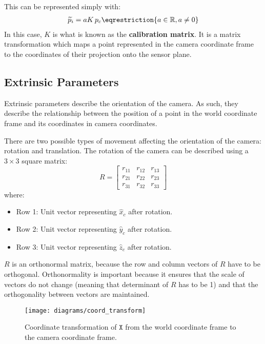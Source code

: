 This can be represented simply with:
\begin{gather}
    \widetilde{p}_i = aK\, p_c \label{eq:pi} \eqrestriction{a \in \Real, a \neq 0}
\end{gather}
In this case, $K$ is what is known as the \textbf{calibration matrix}. It is a matrix transformation which maps a point represented in the camera coordinate frame to the coordinates of their projection onto the sensor plane.

\subsection{Extrinsic Parameters} \label{sec:extrinsics}

Extrinsic parameters describe the orientation of the camera. As such, they describe the relationship between the position of a point in the world coordinate frame and its coordinates in camera coordinates.

There are two possible types of movement affecting the orientation of the camera: rotation and translation. The rotation of the camera can be described using a $3 \times 3$ square matrix:
\begin{equation}
    R =
    \begin{bmatrix}
        r_{11} & r_{12} & r_{13} \\
        r_{21} & r_{22} & r_{23} \\
        r_{31} & r_{32} & r_{33}
    \end{bmatrix}
\end{equation}
\noindent where:
\begin{itemize}
    \item Row 1: Unit vector representing $\hat{x}_c$ after rotation.
    \item Row 2: Unit vector representing $\hat{y}_c$ after rotation.
    \item Row 3: Unit vector representing $\hat{z}_c$ after rotation.
\end{itemize}
$R$ is an orthonormal matrix, because the row and column vectors of $R$ have to be orthogonal. Orthonormality is important because it ensures that the scale of vectors do not change (meaning that determinant of $R$ has to be 1) and that the orthogonality between vectors are maintained.

\begin{figure}[H]
    \centering
    \texttt{[image: diagrams/coord\_transform]}
    \caption{Coordinate transformation of $\mathtt{X}$ from the world coordinate frame to the camera coordinate frame.}
    \label{fig:ext}
\end{figure}


